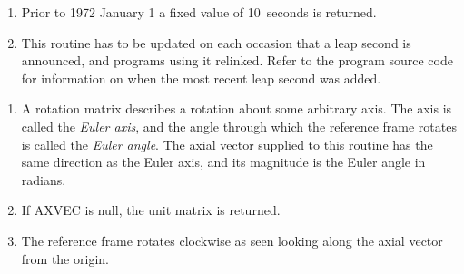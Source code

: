 {
}
{
}
{
}
\notes
{
 \begin{enumerate}
 \item Prior to 1972 January 1 a fixed value of 10~seconds is returned.
 \item This routine has to be updated on each occasion that a
       leap second is announced, and programs using it relinked.
       Refer to the program source code for information on when the
       most recent leap second was added.
 \end{enumerate}
}
{
}
{
}
{
}
\notes
{
 \begin{enumerate}
  \item A rotation matrix describes a rotation about some arbitrary axis.
        The axis is called the {\it Euler axis}, and the angle through which the
        reference frame rotates is called the {\it Euler angle}.  The axial
        vector supplied to this routine has the same direction as the
        Euler axis, and its magnitude is the Euler angle in radians.
  \item If AXVEC is null, the unit matrix is returned.
  \item The reference frame rotates clockwise as seen looking along
        the axial vector from the origin.
 \end{enumerate}
}
{
}
{
  \\
}
{
}
